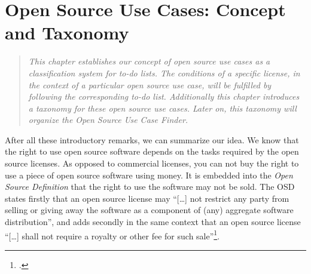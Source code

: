 %
%
%
%
%



\chapter{Open Source Use Cases: Concept and Taxonomy}\label{sec:OSUCdeduction}

\footnotesize
\begin{quote}\itshape
This chapter establishes our concept of \emph{open source use cases} as a
classification system for to-do lists. The conditions of a specific license, in
the context of a par\-ti\-cu\-lar \emph{open source use case}, will be fulfilled
by following the corresponding to-do list. Additionally this chapter introduces a
taxonomy for these \emph{open source use cases}. Later on, this taxonomy will
organize the \emph{Open Source Use Case Finder}.
\end{quote}
\normalsize{}

After all these introductory remarks, we can summarize our idea. We know that
the right to use open source software depends on the tasks required by the open
source licenses. As opposed to commercial licenses, you can not buy the right to
use a piece of open source software using money. It is embedded into the
\emph{Open Source Definition} that the right to use the software may not be
sold. The OSD states firstly that an open source license may \enquote{[\ldots]
not restrict any party from selling or giving away the software as a component
of (any) aggregate software distribution}, and adds secondly in the same context
that an open source license \enquote{[\ldots] shall not require a royalty or
other fee for such sale}\footcite[cf.][\nopage wp. §1]{OSI2012a}.

